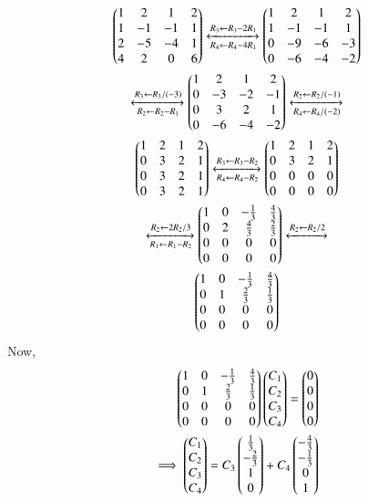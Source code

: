 \documentclass[journal,12pt,twocolumn]{IEEEtran}
\begin{document}
\begin{multline}
\begin{pmatrix}1 & 2 & 1 & 2\\1 & -1 & -1 & 1\\2 & -5 & -4 & 1\\4 & 2 & 0 & 6\end{pmatrix} \xleftrightarrow[R_4\leftarrow R_4 - 4R_1]{R_3\leftarrow R_3-2R_1}\begin{pmatrix}1 & 2 & 1 & 2\\1 & -1 & -1 & 1\\0 & -9 & -6 & -3\\0 & -6 & -4 & -2\end{pmatrix}\\
\xleftrightarrow[R_2\leftarrow R_2 - R_1]{R_3\leftarrow R_3/(-3)}\begin{pmatrix}1 & 2 & 1 & 2\\0 & -3 & -2 & -1\\0 & 3 & 2 & 1\\0 & -6 & -4 & -2\end{pmatrix}\xleftrightarrow[R_4\leftarrow R_4/(-2)]{R_2\leftarrow R_2/(-1)}\\
\begin{pmatrix}1 & 2 & 1 & 2\\0 & 3 & 2 & 1\\0 & 3 & 2 & 1\\0 & 3 & 2 & 1\end{pmatrix}\xleftrightarrow[R_4\leftarrow R_4-R_2]{R_3\leftarrow R_3-R_2}\begin{pmatrix}1 & 2 & 1 & 2\\0 & 3 & 2 & 1\\0 & 0 & 0 & 0\\0 & 0 & 0 & 0\end{pmatrix}\\
\xleftrightarrow[R_1\leftarrow R_1-R_2]{R_2\leftarrow 2R_2/3}\begin{pmatrix}1 & 0 & -\frac{1}{3} & \frac{4}{3}\\0 & 2 & \frac{4}{3} & \frac{2}{3}\\0 & 0 & 0 & 0\\0 & 0 & 0 & 0\end{pmatrix}\xleftrightarrow[]{R_2\leftarrow R_2/2}\\
\begin{pmatrix}1 & 0 & -\frac{1}{3} & \frac{4}{3}\\0 & 1 & \frac{2}{3} & \frac{1}{3}\\0 & 0 & 0 & 0\\0 & 0 & 0 & 0\end{pmatrix}
\end{multline}
Now, 
\begin{align}
\begin{pmatrix}1 & 0 & -\frac{1}{3} & \frac{4}{3}\\0 & 1 & \frac{2}{3} & \frac{1}{3}\\0 & 0 & 0 & 0\\0 & 0 & 0 & 0\end{pmatrix} \begin{pmatrix}C_1\\C_2\\C_3\\C_4\end{pmatrix} = \begin{pmatrix}0\\0\\0\\0\end{pmatrix}\\
\implies \begin{pmatrix}C_1\\C_2\\C_3\\C_4\end{pmatrix} = C_3 \begin{pmatrix}\frac{1}{3}\\-\frac{2}{3}\\1\\0\end{pmatrix} +C_4 \begin{pmatrix}-\frac{4}{3}\\-\frac{1}{3}\\0\\1\end{pmatrix}
\end{align}
\end{document}
